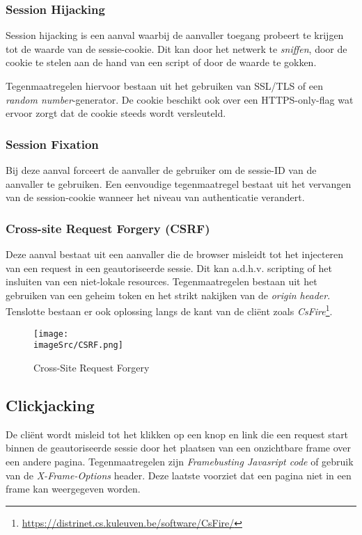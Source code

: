 \documentclass[../main.tex]{subfiles}
\begin{document}
\subsubsection{Session Hijacking}
Session hijacking is een aanval waarbij de aanvaller toegang probeert te krijgen tot de waarde van de sessie-cookie. Dit kan door het netwerk te \textit{sniffen}, door de cookie te stelen aan de hand van een script of door de waarde te gokken. 

Tegenmaatregelen hiervoor bestaan uit het gebruiken van SSL/TLS of een \textit{random number}-generator. De cookie beschikt ook over een HTTPS-only-flag wat ervoor zorgt dat de cookie steeds wordt versleuteld. 

\subsubsection{Session Fixation}
Bij deze aanval forceert de aanvaller de gebruiker om de sessie-ID van de aanvaller te gebruiken. Een eenvoudige tegenmaatregel bestaat uit het vervangen van de session-cookie wanneer het niveau van authenticatie verandert.

\subsubsection{Cross-site Request Forgery (CSRF)}
Deze aanval bestaat uit een aanvaller die de browser misleidt tot het injecteren van een request in een geautoriseerde sessie. 
Dit kan a.d.h.v. scripting of het insluiten van een niet-lokale resources.
Tegenmaatregelen bestaan uit het gebruiken van een geheim token en het strikt nakijken van de \textit{origin header}.
Tenslotte bestaan er ook oplossing langs de kant van de cli\"ent zoals \textit{CsFire}\footnote{\url{https://distrinet.cs.kuleuven.be/software/CsFire/}}.

\begin{figure}[h!]
    \centering
    \texttt{[image: \\imageSrc/CSRF.png]}
    \caption{Cross-Site Request Forgery}
    \label{fig:awesome_image}
\end{figure}

\subsection{Clickjacking}
De cli\"ent wordt misleid tot het klikken op een knop en link die een request start binnen de geautoriseerde sessie door het plaatsen van een onzichtbare frame over een andere pagina. Tegenmaatregelen zijn \textit{Framebusting Javasript code} of gebruik van de \textit{X-Frame-Options} header. Deze laatste voorziet dat een pagina niet in een frame kan weergegeven worden.
\end{document}
